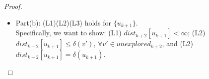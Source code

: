 \begin{proof}
\begin{itemize}
  \\\\
  \texttt{Proof of (L1)}: Since the induction hypothesis implies that $\forall q \in explored_{k+1}, dist_{k+1}[q] < \infty$, and the proof of (L3) above shows that $dist_{k+2}[q] = dist_{k+1}[q]$, then $dist_{k+2}[q] < \infty$. (L1) holds for $explored_{k+1}$.
  \\\\
  Hence we have proved that both (1) and (2) holds for all nodes in $explored_{k+1}$.

  \item Part(b): (L1)(L2)(L3) holds for $\{u_{k+1}\}$. 
  \\
  Specifically, we want to show: (L1) $dist_{k+2}[u_{k+1}] < \infty$; (L2) $dist_{k+2}[u_{k+1}] \leq \delta(v')$, $\forall v' \in unexplored_{k+2}$, and (L2) $dist_{k+2}[u_{k+1}] = \delta(u_{k+1})$. 



\end{itemize}
\end{proof}
